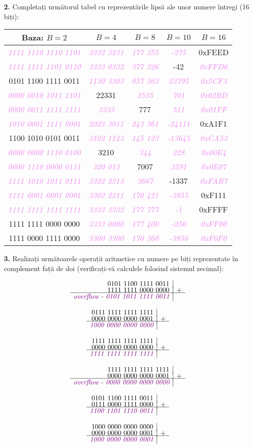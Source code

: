 \documentclass[a4paper]{article}
\renewcommand{\arraystretch}{1.4}
\newcommand{\hl}[1]{\textcolor{violet}{\textit{#1}}}
\newcommand{\binarysum}[3]{%
    \[
    \begin{array}{r|l}
    \text{#1} \\[-3pt]
    \text{#2} & + \\[-3pt]
    \hline
    \hl{#3} \\
    \end{array}
    \]
}
\begin{document}
\textbf{2.} Completați următorul tabel cu reprezentările lipsă ale unor numere întregi (16 biți):
\begin{table}[h!]
\centering
\renewcommand{\arraystretch}{1.3}
\setlength{\tabcolsep}{10pt}
\begin{tabular}{|c|c|c|c|c|}
\hline
\textbf{Baza: $B=2$} & \textbf{$B=4$} & \textbf{$B=8$} & \textbf{$B=10$} & \textbf{$B=16$} \\ \hline
\hl{1111 1110 1110 1101} & \hl{3332 3231} & \hl{177 355} & \hl{-275} & 0xFEED \\ \hline
\hl{1111 1111 1101 0110} & \hl{3333 0332} & \hl{377 326} & -42 & \hl{0xFFD6} \\ \hline
0101 1100 1111 0011 & \hl{1130 3303} & \hl{057 363} & \hl{23795} & \hl{0x5CF3} \\ \hline
\hl{0000 0010 1011 1101} & 22331 & \hl{2535} & \hl{701} & \hl{0x02BD} \\ \hline
\hl{0000 0011 1111 1111} & \hl{3333} & 777 & \hl{511} & \hl{0x01FF} \\ \hline
\hl{1010 0001 1111 0001} & \hl{2023 3011} & \hl{243 361} & \hl{-24111} & 0xA1F1 \\ \hline
1100 1010 0101 0011 & \hl{3102 1123} & \hl{145 123} & \hl{-13645} & \hl{0xCA53} \\ \hline
\hl{0000 0000 1110 0100} & 3210 & \hl{344} & \hl{228} & \hl{0x00E4} \\ \hline
\hl{0000 1110 0000 0111} & \hl{320 013} & 7007 & \hl{3591} & \hl{0x0E07} \\ \hline
\hl{1111 1010 1011 0111} & \hl{3322 2313} & \hl{3667} & -1337 & \hl{0xFAB7} \\ \hline
\hl{1111 0001 0001 0001} & \hl{3302 2211} & \hl{170 421} & \hl{-3855} & 0xF111 \\ \hline
\hl{1111 1111 1111 1111} & \hl{3333 3333} & \hl{177 777} & \hl{-1} & 0xFFFF \\ \hline
1111 1111 0000 0000 & \hl{3333 0000} & \hl{177 400} & \hl{-256} & \hl{0xFF00} \\ \hline
1111 0000 1111 0000 & \hl{3300 3300} & \hl{170 360} & \hl{-3856} & \hl{0xF0F0} \\ \hline
\end{tabular}
\end{table}
\vspace{0.75cm}

\textbf{3.} Realizați următoarele operații aritmetice cu numere pe biți reprezentate în complement față de doi (verificați-vă calculele folosind sistemul zecimal):
\begin{multicols}{2}
\binarysum{0101 1100 1111 0011}{1111 1111 0000 0000}{\textit{overflow} - \hl{0101 1011 1111 0011}}
\binarysum{0111 1111 1111 1111}{0000 0000 0000 0001}{\hl{1000 0000 0000 0000}}
\binarysum{1111 1111 1111 1111}{0000 0000 0000 0000}{\hl{1111 1111 1111 1111}}
\binarysum{1111 1111 1111 1111}{0000 0000 0000 0001}{\textit{overflow} - \hl{0000 0000 0000 0000}}
\binarysum{0101 1100 1111 0011}{0111 0000 1111 0000}{\hl{1100 1101 1110 0011}}
\binarysum{1000 0000 0000 0000}{0000 0000 0000 0001}{\hl{1000 0000 0000 0001}}
\end{multicols}
\end{document}

